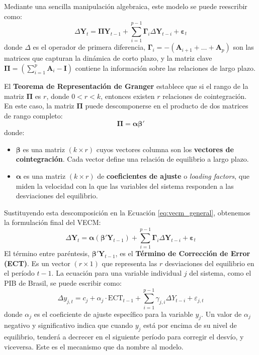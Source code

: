 \documentclass[12pt, a4paper]{article}
\begin{document}
Mediante una sencilla manipulación algebraica, este modelo se puede reescribir como:
\begin{equation}
\Delta \mathbf{Y}_t = \boldsymbol{\Pi} \mathbf{Y}_{t-1} + \sum_{i=1}^{p-1} \boldsymbol{\Gamma}_i \Delta \mathbf{Y}_{t-i} + \boldsymbol{\varepsilon}_t
\label{eq:vecm_general}
\end{equation}
donde $\Delta$ es el operador de primera diferencia, $\boldsymbol{\Gamma}_i = -(\mathbf{A}_{i+1} + \dots + \mathbf{A}_p)$ son las matrices que capturan la dinámica de corto plazo, y la matriz clave $\boldsymbol{\Pi} = (\sum_{i=1}^{p} \mathbf{A}_i - \mathbf{I})$ contiene la información sobre las relaciones de largo plazo.

El \textbf{Teorema de Representación de Granger} establece que si el rango de la matriz $\boldsymbol{\Pi}$ es $r$, donde $0 < r < k$, entonces existen $r$ relaciones de cointegración. En este caso, la matriz $\boldsymbol{\Pi}$ puede descomponerse en el producto de dos matrices de rango completo:
\begin{equation}
\boldsymbol{\Pi} = \boldsymbol{\alpha} \boldsymbol{\beta}'
\end{equation}
donde:
\begin{itemize}
    \item $\boldsymbol{\beta}$ es una matriz $(k \times r)$ cuyos vectores columna son los \textbf{vectores de cointegración}. Cada vector define una relación de equilibrio a largo plazo.
    \item $\boldsymbol{\alpha}$ es una matriz $(k \times r)$ de \textbf{coeficientes de ajuste} o \textit{loading factors}, que miden la velocidad con la que las variables del sistema responden a las desviaciones del equilibrio.
\end{itemize}
Sustituyendo esta descomposición en la Ecuación \ref{eq:vecm_general}, obtenemos la formulación final del VECM:
\begin{equation}
\Delta \mathbf{Y}_t = \boldsymbol{\alpha} (\boldsymbol{\beta}' \mathbf{Y}_{t-1}) + \sum_{i=1}^{p-1} \boldsymbol{\Gamma}_i \Delta \mathbf{Y}_{t-i} + \boldsymbol{\varepsilon}_t
\end{equation}
El término entre paréntesis, $\boldsymbol{\beta}' \mathbf{Y}_{t-1}$, es el \textbf{Término de Corrección de Error (ECT)}. Es un vector $(r \times 1)$ que representa las $r$ desviaciones del equilibrio en el período $t-1$. La ecuación para una variable individual $j$ del sistema, como el PIB de Brasil, se puede escribir como:
\begin{equation}
\Delta y_{j,t} = c_j + \alpha_j \cdot \text{ECT}_{t-1} + \sum_{i=1}^{p-1} \gamma_{j,i} \Delta Y_{t-i} + \varepsilon_{j,t}
\end{equation}
donde $\alpha_j$ es el coeficiente de ajuste específico para la variable $y_j$. Un valor de $\alpha_j$ negativo y significativo indica que cuando $y_j$ está por encima de su nivel de equilibrio, tenderá a decrecer en el siguiente período para corregir el desvío, y viceversa. Este es el mecanismo que da nombre al modelo.
\end{document}
